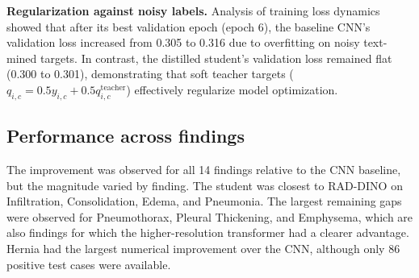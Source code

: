 \documentclass[conference]{IEEEtran}
\begin{document}
\textbf{Regularization against noisy labels.} Analysis of training loss dynamics showed that after its best validation epoch (epoch 6), the baseline CNN's validation loss increased from 0.305 to 0.316 due to overfitting on noisy text-mined targets. In contrast, the distilled student's validation loss remained flat (0.300 to 0.301), demonstrating that soft teacher targets ($q_{i,c} = 0.5 y_{i,c} + 0.5 q^{\text{teacher}}_{i,c}$) effectively regularize model optimization.

\subsection{Performance across findings}
\label{sec:finding-results}

The improvement was observed for all 14 findings relative to the CNN baseline,
but the magnitude varied by finding. The student was closest to RAD-DINO on
Infiltration, Consolidation, Edema, and Pneumonia. The largest remaining gaps
were observed for Pneumothorax, Pleural Thickening, and Emphysema, which are
also findings for which the higher-resolution transformer had a clearer
advantage. Hernia had the largest numerical improvement over the CNN, although
only 86 positive test cases were available.
\end{document}
